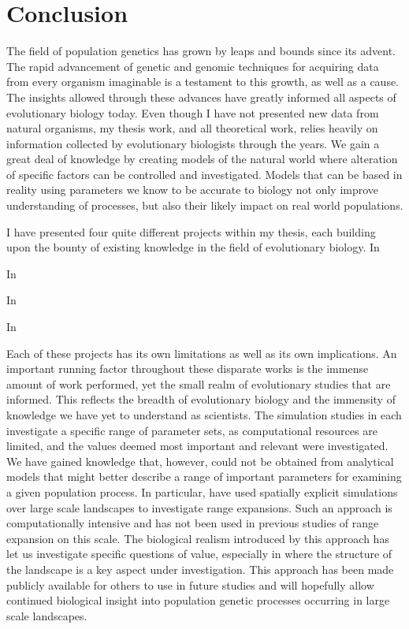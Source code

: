 \chapter{Conclusion}
\label{chap:conclusions}

The field of population genetics has grown by leaps and bounds since its advent. The rapid advancement of genetic and genomic techniques for acquiring data from every organism imaginable is a testament to this growth, as well as a cause. The insights allowed through these advances have greatly informed all aspects of evolutionary biology today. Even though I have not presented new data from natural organisms, my thesis work, and all theoretical work, relies heavily on information collected by evolutionary biologists through the years. We gain a great deal of knowledge by creating models of the natural world where alteration of specific factors can be controlled and investigated. Models that can be based in reality using parameters we know to be accurate to biology not only improve understanding of processes, but also their likely impact on real world populations.

I have presented four quite different projects within my thesis, each building upon the bounty of existing knowledge in the field of evolutionary biology. In 

In 

In 

In 

Each of these projects has its own limitations as well as its own implications. An important running factor throughout these disparate works is the immense amount of work performed, yet the small realm of evolutionary studies that are informed. This reflects the breadth of evolutionary biology and the immensity of knowledge we have yet to understand as scientists. The simulation studies in  each investigate a specific range of parameter sets, as computational resources are limited, and the values deemed most important and relevant were investigated. We have gained knowledge that, however, could not be obtained from analytical models that might better describe a range of important parameters for examining a given population process. In particular,  have used spatially explicit simulations over large scale landscapes to investigate range expansions. Such an approach is computationally intensive and has not been used in previous studies of range expansion on this scale. The biological realism introduced by this approach has let us investigate specific questions of value, especially in  where the structure of the landscape is a key aspect under investigation. This approach has been made publicly available for others to use in future studies and will hopefully allow continued biological insight into population genetic processes occurring in large scale landscapes.

